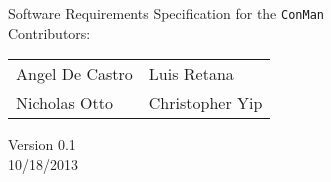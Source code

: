 \begin{titlepage}
\Huge
\vspace{2cm}
\begin{center}
Software Requirements Specification for the \texttt{ConMan}\\
\vspace{3cm}
\Large
Contributors:\\ 

\begin{tabular}{l l}\hline
Angel De Castro & Luis Retana\\
Nicholas Otto   & Christopher Yip
\end{tabular}
\vspace{1cm}

Version 0.1\\
10/18/2013
\end{center}


\end{titlepage}
